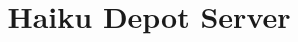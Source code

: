 \documentclass[a4paper,11pt]{article}
\begin{document}
\title{Haiku Depot Server}

\maketitle

\pagebreak








\end{document}
